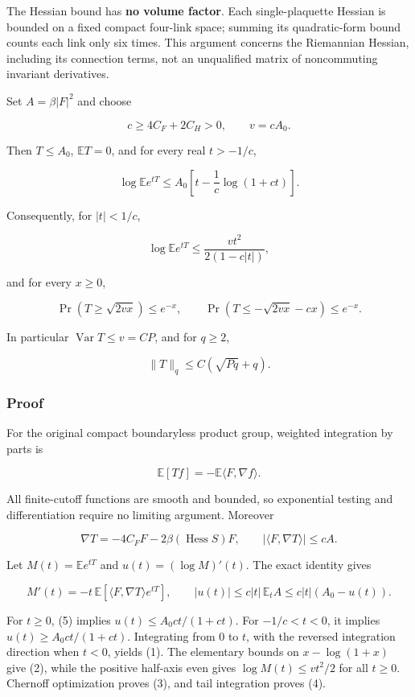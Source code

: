 \documentclass[
  11pt,
]{article}
\begin{document}
The Hessian bound has \textbf{no volume factor}. Each single-plaquette
Hessian is bounded on a fixed compact four-link space; summing its
quadratic-form bound counts each link only six times. This argument
concerns the Riemannian Hessian, including its connection terms, not an
unqualified matrix of noncommuting invariant derivatives.

Set \(A=\beta|F|^2\) and choose

\[
 c\ge 4C_F+2C_H>0,\qquad v=cA_0.
\]

Then \(T\le A_0\), \(\mathbb E T=0\), and for every real \(t>-1/c\),

\[
 \boxed{\quad
 \log\mathbb E e^{tT}
 \le A_0\left[t-\frac1c\log(1+ct)\right].
 \quad} \tag{1}
\]

Consequently, for \(|t|<1/c\),

\[
 \log\mathbb E e^{tT}\le\frac{vt^2}{2(1-c|t|)}, \tag{2}
\]

and for every \(x\ge0\),

\[
 \Pr(T\ge\sqrt{2vx})\le e^{-x},\qquad
 \Pr(T\le-\sqrt{2vx}-cx)\le e^{-x}. \tag{3}
\]

In particular \(\operatorname{Var}T\le v=CP\), and for \(q\ge2\),

\[
 \|T\|_q\le C\left(\sqrt{Pq}+q\right). \tag{4}
\]

\hypertarget{proof}{%
\subsubsection{Proof}\label{proof}}

For the original compact boundaryless product group, weighted
integration by parts is

\[
 \mathbb E[T f]=-\mathbb E\langle F,\nabla f\rangle.
\]

All finite-cutoff functions are smooth and bounded, so exponential
testing and differentiation require no limiting argument. Moreover

\[
 \nabla T=-4C_FF-2\beta(\operatorname{Hess}S)F,
 \qquad |\langle F,\nabla T\rangle|\le cA.
\]

Let \(M(t)=\mathbb Ee^{tT}\) and \(u(t)=(\log M)'(t)\). The exact
identity gives

\[
 M'(t)=-t\,\mathbb E[\langle F,\nabla T\rangle e^{tT}],
 \qquad |u(t)|\le c|t|\,\mathbb E_tA\le c|t|(A_0-u(t)). \tag{5}
\]

For \(t\ge0\), (5) implies \(u(t)\le A_0ct/(1+ct)\). For \(-1/c<t<0\),
it implies \(u(t)\ge A_0ct/(1+ct)\). Integrating from 0 to \(t\), with
the reversed integration direction when \(t<0\), yields (1). The
elementary bounds on \(x-\log(1+x)\) give (2), while the positive
half-axis even gives \(\log M(t)\le vt^2/2\) for all \(t\ge0\). Chernoff
optimization proves (3), and tail integration proves (4).
\end{document}
